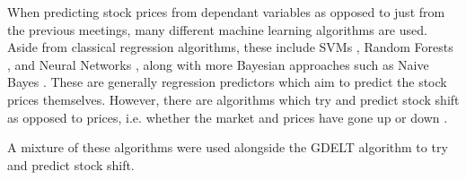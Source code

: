 When predicting stock prices from dependant variables as opposed to just from the previous meetings, many different machine learning algorithms are used. Aside from classical regression algorithms, these include SVMs \cite{cao2003support}, Random Forests \cite{khaidem2016predicting}, and Neural Networks \cite{egeli2003stock}, along with more Bayesian approaches such as Naive Bayes \cite{khedr2017predicting}. These are generally regression predictors which aim to predict the stock prices themselves. However, there are algorithms which try and predict stock shift as opposed to prices, i.e. whether the market and prices have gone up or down \cite{nguyen2015sentiment}.  

A mixture of these algorithms were used alongside the GDELT algorithm to try and predict stock shift. 

